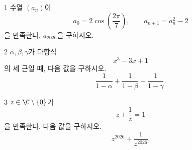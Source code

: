 \documentclass[11pt,oneside]{article}
\begin{document}

\begin{problem}{1}
수열 $(a_n)$이
\[
    a_0=2\cos\left(\frac{2\pi}{7}\right),
    \qquad
    a_{n+1}=a_n^2-2
\]
을 만족한다. $a_{2026}$을 구하시오.
\end{problem}

\begin{problem}{2}
$\alpha,\beta,\gamma$가 다항식
\[
    x^3-3x+1
\]
의 세 근일 때, 다음 값을 구하시오.
\[
    \frac{1}{1-\alpha}
    +\frac{1}{1-\beta}
    +\frac{1}{1-\gamma}.
\]
\end{problem}

\begin{problem}{3}
$z\in\C\setminus\{0\}$가
\[
    z+\frac{1}{z}=1
\]
을 만족한다. 다음 값을 구하시오.
\[
    z^{2026}+\frac{1}{z^{2026}}.
\]
\end{problem}
\end{document}
